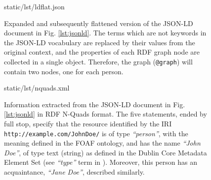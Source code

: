 \begin{figure}[!ht]
  
    {static/lst/ldflat.json}
    \caption[Expanded and flattened JSON-LD document]
            {Expanded and subsequently flattened version of the JSON-LD document
             in Fig. \ref{lst:jsonld}. The terms which are not keywords in the
             JSON-LD vocabulary are replaced by their values from the original
             context, and the properties of each RDF graph node are collected in
             a single object. Therefore, the graph (\texttt{@graph}) will
             contain two nodes, one for each person.}
    \label{lst:ldflat}
\end{figure}

\begin{figure}[!ht]
  
    {static/lst/nquads.xml}
    \caption[Information extracted from JSON-LD document in RDF N-Quads format]
            {Information extracted from the JSON-LD document in
             Fig. \ref{lst:jsonld} in RDF N-Quads format. The five statements,
             ended by full stop, specify that the resource identified by the IRI
             \texttt{http://example.com/JohnDoe/} is of type
             \textit{``person''}, with the meaning defined in the FOAF ontology,
             and has the name \textit{``John Doe''}, of type text (string) as
             defined in the Dublin Core Metadata Element Set (see
             \textit{``type''} term in \cite{ref:dc}). Moreover, this person has
             an acquaintance, \textit{``Jane Doe''}, described similarly.}
    \label{lst:nquads}
\end{figure}

